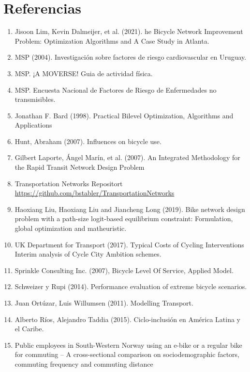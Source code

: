 \documentclass{article}
\begin{document}
  \section{Referencias}

  \begin{enumerate}
    \item{\label{lim2021}} Jisoon Lim, Kevin Dalmeijer, et al. (2021). he Bicycle Network Improvement Problem: Optimization Algorithms and A Case Study in Atlanta.
    \item{\label{heartrisksuy} MSP (2004). Investigación sobre factores de riesgo cardiovascular en Uruguay.}
    \item{\label{mspphisicalactivityguid} MSP. ¡A MOVERSE! Guia de actividad física.}
    \item{\label{mspsurveyriskfactors} MSP. Encuesta Nacional de Factores de Riesgo de Enfermedades no transmisibles.}
    \item{\label{bardbook} Jonathan F. Bard (1998). Practical Bilevel Optimization, Algorithms and Applications}
    \item{\label{hunt2007} Hunt, Abraham (2007). Influences on bicycle use.}
    \item{\label{laporte2007} Gilbert Laporte, Ángel Marín, et al. (2007). An Integrated Methodology for the Rapid Transit Network Design Problem}
    \item{\label{transportationnetworkrepo} Transportation Networks Repositort \url{https://github.com/bstabler/TransportationNetworks}}
    \item{\label{liu2019} Haoxiang Liu, Haoxiang Liu and Jiancheng Long (2019). Bike network design problem with a path-size logit-based equilibrium constraint: Formulation, global optimization and matheuristic.}
    \item{\label{typicalcostsofcylcing} UK Department for Transport (2017). Typical Costs of Cycling Interventions Interim analysis of Cycle City Ambition schemes.}
    \item{\label{blos2007} Sprinkle Consulting Inc. (2007), Bicycle Level Of Service, Applied Model.}
    \item{\label{shwe2014} Schweizer y Rupi (2014). Performance evaluation of extreme bicycle scenarios.}
    \item{\label{ortuz2011} Juan Ortúzar, Luis Willumsen (2011). Modelling Transport.}
    \item{\label{rios2015} Alberto Ríos, Alejandro Taddia (2015). Ciclo-inclusión en América Latina y el Caribe.}
    \item{\label{anette2018} Public employees in South-Western Norway using an e-bike or a regular bike for commuting – A cross-sectional comparison on sociodemographic factors, commuting frequency and commuting distance}
  \end{enumerate}
\end{document}
